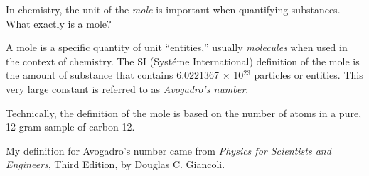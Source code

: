 

In chemistry, the unit of the {\it mole} is important when quantifying substances.  What exactly is a mole?







A mole is a specific quantity of unit ``entities,'' usually {\it molecules} when used in the context of chemistry.  The SI (Syst\'eme International) definition of the mole is the amount of substance that contains 6.0221367 $\times$ 10$^{23}$ particles or entities.  This very large constant is referred to as {\it Avogadro's number}.







Technically, the definition of the mole is based on the number of atoms in a pure, 12 gram sample of carbon-12.

\vskip 10pt

My definition for Avogadro's number came from {\it Physics for Scientists and Engineers}, Third Edition, by Douglas C. Giancoli.





